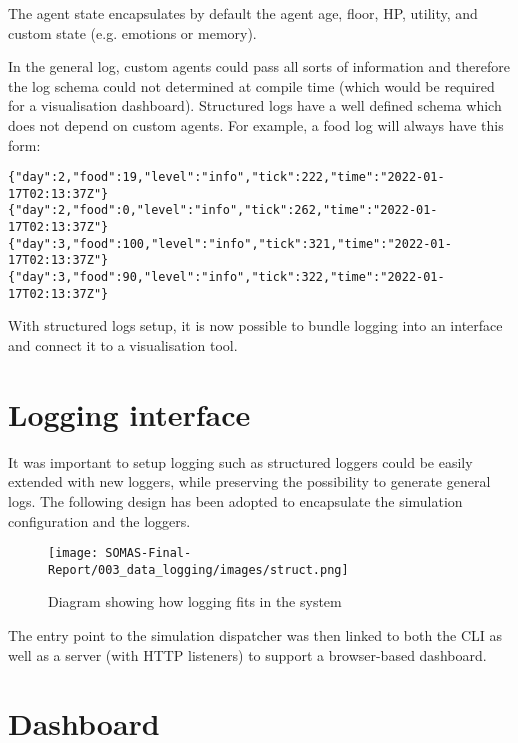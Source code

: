 The agent state encapsulates by default the agent age, floor, HP, utility, and custom state (e.g. emotions or memory).

In the general log, custom agents could pass all sorts of information and therefore the log schema could not determined at compile time (which would be required for a visualisation dashboard). Structured logs have a well defined schema which does not depend on custom agents. For example, a food log will always have this form:

\begin{verbatim}
{"day":2,"food":19,"level":"info","tick":222,"time":"2022-01-17T02:13:37Z"}
{"day":2,"food":0,"level":"info","tick":262,"time":"2022-01-17T02:13:37Z"}
{"day":3,"food":100,"level":"info","tick":321,"time":"2022-01-17T02:13:37Z"}
{"day":3,"food":90,"level":"info","tick":322,"time":"2022-01-17T02:13:37Z"}
\end{verbatim}

With structured logs setup, it is now possible to bundle logging into an interface and connect it to a visualisation tool.

\section{Logging interface}

It was important to setup logging such as structured loggers could be easily extended with new loggers, while preserving the possibility to generate general logs. The following design has been adopted to encapsulate the simulation configuration and the loggers.

\begin{figure}[htb]
    \centering
    \texttt{[image: SOMAS-Final-Report/003\_data\_logging/images/struct.png]}
    \caption{Diagram showing how logging fits in the system}
    \label{fig:design_logging}
\end{figure}

The entry point to the simulation dispatcher was then linked to both the CLI as well as a server (with HTTP listeners) to support a browser-based dashboard.

\section{Dashboard}

